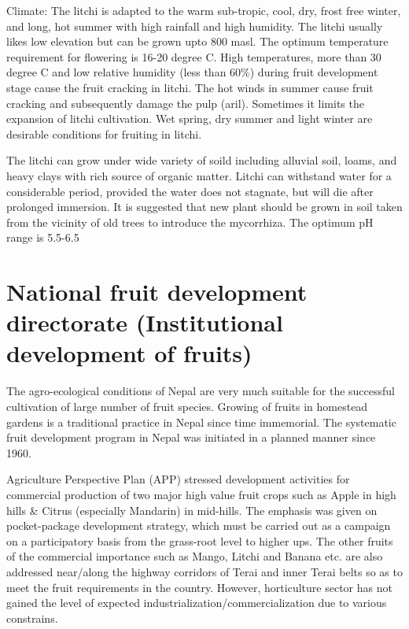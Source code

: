\documentclass[
]{book}
\begin{document}
Climate: The litchi is adapted to the warm sub-tropic, cool, dry, frost free winter, and long, hot summer with high rainfall and high humidity. The litchi usually likes low elevation but can be grown upto 800 masl. The optimum temperature requirement for flowering is 16-20 degree C. High temperatures, more than 30 degree C and low relative humidity (less than 60\%) during fruit development stage cause the fruit cracking in litchi. The hot winds in summer cause fruit cracking and subsequently damage the pulp (aril). Sometimes it limits the expansion of litchi cultivation. Wet spring, dry summer and light winter are desirable conditions for fruiting in litchi.

The litchi can grow under wide variety of soild including alluvial soil, loams, and heavy clays with rich source of organic matter. Litchi can withstand water for a considerable period, provided the water does not stagnate, but will die after prolonged immersion. It is suggested that new plant should be grown in soil taken from the vicinity of old trees to introduce the mycorrhiza. The optimum pH range is 5.5-6.5

\hypertarget{national-fruit-development-directorate-institutional-development-of-fruits}{%
\section{National fruit development directorate (Institutional development of fruits)}\label{national-fruit-development-directorate-institutional-development-of-fruits}}

The agro-ecological conditions of Nepal are very much suitable for the successful cultivation of large number of fruit species. Growing of fruits in homestead gardens is a traditional practice in Nepal since time immemorial. The systematic fruit development program in Nepal was initiated in a planned manner since 1960.

Agriculture Perspective Plan (APP) stressed development activities for commercial production of two major high value fruit crops such as Apple in high hills \& Citrus (especially Mandarin) in mid-hills. The emphasis was given on pocket-package development strategy, which must be carried out as a campaign on a participatory basis from the grass-root level to higher ups. The other fruits of the commercial importance such as Mango, Litchi and Banana etc. are also addressed near/along the highway corridors of Terai and inner Terai belts so as to meet the fruit requirements in the country. However, horticulture sector has not gained the level of expected industrialization/commercialization due to various constrains.
\end{document}
